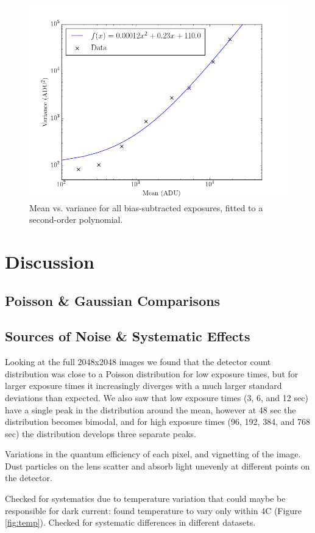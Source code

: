 \documentclass[preprint]{aastex62}
\begin{document}
\begin{figure}[H]
\begin{center}
\includegraphics[width=.48\linewidth]{plots/mean_vs_variance.png}
\caption{Mean vs. variance for all bias-subtracted exposures, fitted to a second-order polynomial.} \label{fig:mean_var}
\end{center}
\end{figure}

\section{Discussion}
\subsection{Poisson \& Gaussian Comparisons} \label{subsec:dist_comparisons}


\subsection{Sources of Noise \& Systematic Effects}
Looking at the full 2048x2048 images we found that the detector count distribution was close to a Poisson distribution for low exposure times, but for larger exposure times it increasingly diverges with a much larger standard deviations than expected. We also saw that low exposure times (3, 6, and 12 sec) have a single peak in the distribution around the mean, however at 48 sec the distribution becomes bimodal, and for high exposure times (96, 192, 384, and 768 sec) the distribution develops three separate peaks. 

Variations in the quantum efficiency of each pixel, and vignetting of the image.
Dust particles on the lens scatter and absorb light unevenly at different points on the detector.

Checked for systematics due to temperature variation that could maybe be responsible for dark current: found temperature to vary only within 4C (Figure \ref{fig:temp}). Checked for systematic differences in different datasets. 
\end{document}
